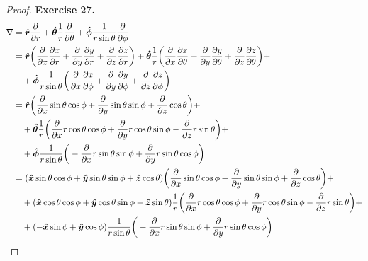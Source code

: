 \documentclass[11pt]{article}
\newcommand{\hatx}{\bm{\hat{x}}}
\newcommand{\haty}{\bm{\hat{y}}}
\newcommand{\hatz}{\bm{\hat{z}}}
\newcommand{\hatr}{\bm{\hat{r}}}
\newcommand{\hatphi}{\bm{\hat{\phi}}}
\newcommand{\hattheta}{\bm{\hat{\theta}}}
\theoremstyle{definition}
\begin{document}
\begin{proof}{\textbf{Exercise 27.}}
    \begin{align*}
        \nabla &= \hatr \partialderivative{}{r}
        + \hattheta \frac{1}{r}\partialderivative{}{\theta}
        + \hatphi \frac{1}{r\sin\theta}\partialderivative{}{\phi}\\
        &= \hatr \bigg(\partialderivative{}{x}\partialderivative{x}{r}
        + \partialderivative{}{y}\partialderivative{y}{r}
        + \partialderivative{}{z}\partialderivative{z}{r}\bigg)
        + \hattheta\frac{1}{r}\bigg(
        \partialderivative{}{x}\partialderivative{x}{\theta}
        + \partialderivative{}{y}\partialderivative{y}{\theta}
        + \partialderivative{}{z}\partialderivative{z}{\theta}\bigg) + \\
        &\quad+ \hatphi\frac{1}{r\sin\theta}\bigg(
            \partialderivative{}{x}\partialderivative{x}{\phi}
            + \partialderivative{}{y}\partialderivative{y}{\phi}
            + \partialderivative{}{z}\partialderivative{z}{\phi}\bigg)\\
        &= \hatr \bigg(\partialderivative{}{x}\sin\theta\cos\phi
        + \partialderivative{}{y}\sin\theta\sin\phi
        + \partialderivative{}{z}\cos\theta
        \bigg)+\\
        &\quad + \hattheta\frac{1}{r}\bigg(
            \partialderivative{}{x}r\cos\theta\cos\phi
            + \partialderivative{}{y}r\cos\theta\sin\phi
            - \partialderivative{}{z}r\sin\theta
        \bigg)+\\
        &\quad + \hatphi\frac{1}{r\sin\theta}\bigg(
            -\partialderivative{}{x}r\sin\theta\sin\phi
            + \partialderivative{}{y}r\sin\theta\cos\phi
        \bigg)\\
        &= (\hatx\sin\theta\cos\phi + \haty\sin\theta\sin\phi + \hatz\cos\theta)
        \bigg(\partialderivative{}{x}\sin\theta\cos\phi
        + \partialderivative{}{y}\sin\theta\sin\phi
        + \partialderivative{}{z}\cos\theta
        \bigg)+\\
        &\quad + (\hatx\cos\theta\cos\phi + \haty\cos\theta\sin\phi - \hatz\sin\theta)
        \frac{1}{r}\bigg(
            \partialderivative{}{x}r\cos\theta\cos\phi
            + \partialderivative{}{y}r\cos\theta\sin\phi
            - \partialderivative{}{z}r\sin\theta
        \bigg)+\\
        &\quad + (-\hatx \sin\phi + \haty\cos\phi)
        \frac{1}{r\sin\theta}\bigg(
            -\partialderivative{}{x}r\sin\theta\sin\phi
            + \partialderivative{}{y}r\sin\theta\cos\phi
        \bigg)\\

\end{align*}
\end{proof}
\end{document}
